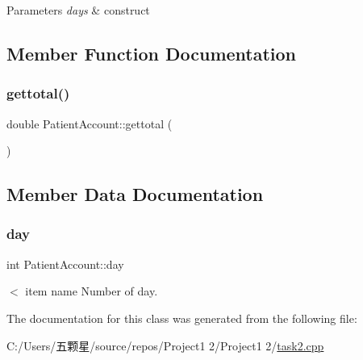 \begin{DoxyParams}{Parameters}
{\em days} & construct \\
\hline
\end{DoxyParams}


\subsection{Member Function Documentation}
\mbox{\label{class_patient_account_a9161b18171c0a9e020485cd6930cb100}} 
\subsubsection{\texorpdfstring{gettotal()}{gettotal()}}
{\footnotesize\ttfamily double Patient\+Account\+::gettotal (\begin{DoxyParamCaption}{ }\end{DoxyParamCaption})\hspace{0.3cm}{\ttfamily [inline]}}



\subsection{Member Data Documentation}
\mbox{\label{class_patient_account_a32470f327c1cf9fc4d68f32769a489b9}} 
\subsubsection{\texorpdfstring{day}{day}}
{\footnotesize\ttfamily int Patient\+Account\+::day\hspace{0.3cm}{\ttfamily [private]}}

$<$ item name Number of day. 

The documentation for this class was generated from the following file\+:\begin{DoxyCompactItemize}
\item 
C\+:/\+Users/五颗星/source/repos/\+Project1 2/\+Project1 2/\mbox{\hyperlink{task2_8cpp}{task2.\+cpp}}\end{DoxyCompactItemize}
